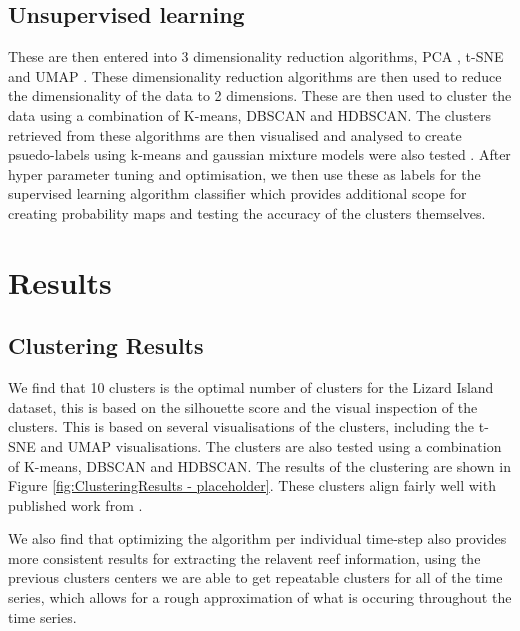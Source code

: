 \documentclass[journal,article,submit,pdftex,moreauthors]{Definitions/mdpi}
\begin{document}
\subsection*{Unsupervised learning}
These are then entered into 3 dimensionality reduction algorithms, PCA \cite{pearson1901}, t-SNE \cite{van2008visualizing} and UMAP \cite{mcinnes2018umap}. These dimensionality reduction algorithms are then used to reduce the dimensionality of the data to 2 dimensions. These are then used to cluster the data using a combination of K-means, DBSCAN and HDBSCAN. The clusters retrieved from these algorithms 
are then visualised and analysed to create psuedo-labels using k-means \cite{macqueen1967some} and gaussian mixture models were also tested \cite{rasmussen1999infinite}. After hyper parameter tuning and optimisation, we then use these as labels for the supervised learning algorithm classifier which provides
additional scope for creating probability maps and testing the accuracy of the clusters themselves. 





\section{Results}

\subsection*{Clustering Results}
We find that 10 clusters is the optimal number of clusters for the Lizard Island dataset, this is based on the silhouette score and the visual inspection of the clusters. This is based on several visualisations of the clusters, including the t-SNE and UMAP visualisations. 
The clusters are also tested using a combination of K-means, DBSCAN and HDBSCAN. The results of the clustering are shown in Figure \ref{fig:ClusteringResults - placeholder}. These clusters align fairly well with published work from \citep{Kennedy2021}. 

We also find that optimizing the algorithm per individual time-step also provides more consistent results for extracting the relavent reef information, using the previous clusters
centers we are able to get repeatable clusters for all of the time series, which allows for a rough approximation of what is occuring throughout the time series.
\end{document}

